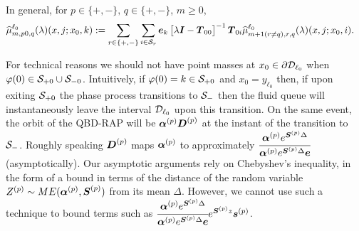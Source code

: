In general, for \(p\in \{+,-\}, \, q\in\{+,-\}\), \(m\geq 0\),
\begin{align*}
	\widehat \mu_{m,p0,q}^{\ell_0}(\lambda)(x,j;x_0,k) \nonumber 
	&:= \sum_{r\in\{+,-\}}\sum_{i\in\mathcal{S}_r}\boldsymbol e_k\begin{bmatrix} \lambda \boldsymbol I - \boldsymbol T_{00} \end{bmatrix}^{-1}\boldsymbol T_{0i}\widehat \mu_{m+1(r\neq q),r,q}^{\ell_0}(\lambda)(x,j;x_0,i).
\end{align*}

\begin{rem}
For technical reasons we should not have point masses at \(x_0\in\partial \mathcal{D}_{\ell_0}\) when \(\varphi(0)\in\mathcal{S}_{+0}\cup\mathcal{S}_{-0}\). Intuitively, if \(\varphi(0)=k\in\mathcal{S}_{+0}\) and \(x_0 = y_{\ell_0}\) then, if upon exiting \(\mathcal{S}_{+0}\) the phase process transitions to \(\mathcal{S}_-\) then the fluid queue will instantaneously leave the interval \(\mathcal{D}_{\ell_0}\) upon this transition. On the same event, the orbit of the QBD-RAP will be \(\boldsymbol \alpha^{(p)} \boldsymbol D^{(p)}\) at the instant of the transition to \(\mathcal{S}_-\). Roughly speaking \(\boldsymbol D^{(p)}\) maps \(\boldsymbol \alpha^{(p)}\) to approximately \(\cfrac{\boldsymbol \alpha^{(p)} e^{\boldsymbol S^{(p)}\Delta}}{\boldsymbol \alpha^{(p)} e^{\boldsymbol S^{(p)}\Delta}\boldsymbol e}\) (asymptotically). Our asymptotic arguments rely on Chebyshev's inequality, in the form of a bound in terms of the distance of the random variable \(Z^{(p)}\sim ME(\boldsymbol\alpha^{(p)},\boldsymbol S^{(p)})\) from its mean \(\Delta\). However, we cannot use such a technique to bound terms such as \(\cfrac{\boldsymbol \alpha^{(p)} e^{\boldsymbol S^{(p)}\Delta}}{\boldsymbol \alpha^{(p)} e^{\boldsymbol S^{(p)}\Delta}\boldsymbol e}e^{\boldsymbol S^{(p)}z}\boldsymbol s^{(p)}\). %


\end{rem}
